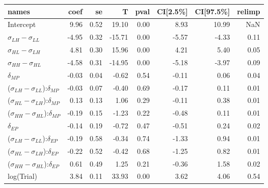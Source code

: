 

\begin{tabular}{lrrrrrrr}
\toprule
                                      names &  coef &   se &      T &  pval &  CI[2.5\%] &  CI[97.5\%] &  relimp \\
\midrule
                                  Intercept &  9.96 & 0.52 &  19.10 &  0.00 &       8.93 &       10.99 &     NaN \\
                $\sigma_{LH} - \sigma_{LL}$ & -4.95 & 0.32 & -15.71 &  0.00 &      -5.57 &       -4.33 &    0.11 \\
                $\sigma_{HL} - \sigma_{LH}$ &  4.81 & 0.30 &  15.96 &  0.00 &       4.21 &        5.40 &    0.05 \\
                $\sigma_{HH} - \sigma_{HL}$ & -4.58 & 0.31 & -14.95 &  0.00 &      -5.18 &       -3.97 &    0.09 \\
                              $\delta_{MP}$ & -0.03 & 0.04 &  -0.62 &  0.54 &      -0.11 &        0.06 &    0.04 \\
($\sigma_{LH} - \sigma_{LL}$):$\delta_{MP}$ & -0.03 & 0.07 &  -0.40 &  0.69 &      -0.17 &        0.11 &    0.01 \\
($\sigma_{HL} - \sigma_{LH}$):$\delta_{MP}$ &  0.13 & 0.13 &   1.06 &  0.29 &      -0.11 &        0.38 &    0.01 \\
($\sigma_{HH} - \sigma_{HL}$):$\delta_{MP}$ & -0.19 & 0.15 &  -1.23 &  0.22 &      -0.48 &        0.11 &    0.01 \\
                              $\delta_{EP}$ & -0.14 & 0.19 &  -0.72 &  0.47 &      -0.51 &        0.24 &    0.02 \\
($\sigma_{LH} - \sigma_{LL}$):$\delta_{EP}$ & -0.19 & 0.58 &  -0.34 &  0.74 &      -1.33 &        0.94 &    0.01 \\
($\sigma_{HL} - \sigma_{LH}$):$\delta_{EP}$ & -0.22 & 0.52 &  -0.42 &  0.68 &      -1.25 &        0.82 &    0.01 \\
($\sigma_{HH} - \sigma_{HL}$):$\delta_{EP}$ &  0.61 & 0.49 &   1.25 &  0.21 &      -0.36 &        1.58 &    0.02 \\
                                 log(Trial) &  3.84 & 0.11 &  33.93 &  0.00 &       3.62 &        4.06 &    0.54 \\
\bottomrule
\end{tabular}



